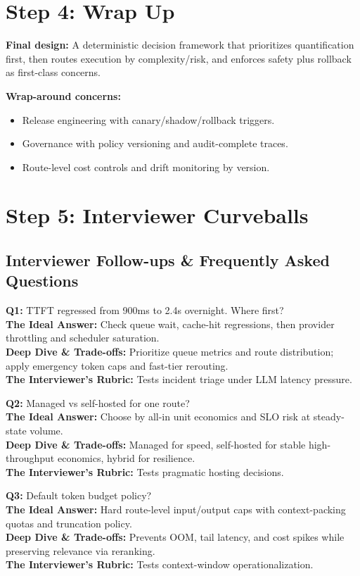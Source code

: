 \section*{Step 4: Wrap Up}
\textbf{Final design:} A deterministic decision framework that prioritizes quantification first, then routes execution by complexity/risk, and enforces safety plus rollback as first-class concerns.

\textbf{Wrap-around concerns:}
\begin{itemize}
  \item Release engineering with canary/shadow/rollback triggers.
  \item Governance with policy versioning and audit-complete traces.
  \item Route-level cost controls and drift monitoring by version.
\end{itemize}

\section*{Step 5: Interviewer Curveballs}
\subsection*{Interviewer Follow-ups \& Frequently Asked Questions}
\textbf{Q1:} TTFT regressed from 900ms to 2.4s overnight. Where first?\\
\textbf{The Ideal Answer:} Check queue wait, cache-hit regressions, then provider throttling and scheduler saturation.\\
\textbf{Deep Dive \& Trade-offs:} Prioritize queue metrics and route distribution; apply emergency token caps and fast-tier rerouting.\\
\textbf{The Interviewer's Rubric:} Tests incident triage under LLM latency pressure.

\textbf{Q2:} Managed vs self-hosted for one route?\\
\textbf{The Ideal Answer:} Choose by all-in unit economics and SLO risk at steady-state volume.\\
\textbf{Deep Dive \& Trade-offs:} Managed for speed, self-hosted for stable high-throughput economics, hybrid for resilience.\\
\textbf{The Interviewer's Rubric:} Tests pragmatic hosting decisions.

\textbf{Q3:} Default token budget policy?\\
\textbf{The Ideal Answer:} Hard route-level input/output caps with context-packing quotas and truncation policy.\\
\textbf{Deep Dive \& Trade-offs:} Prevents OOM, tail latency, and cost spikes while preserving relevance via reranking.\\
\textbf{The Interviewer's Rubric:} Tests context-window operationalization.

